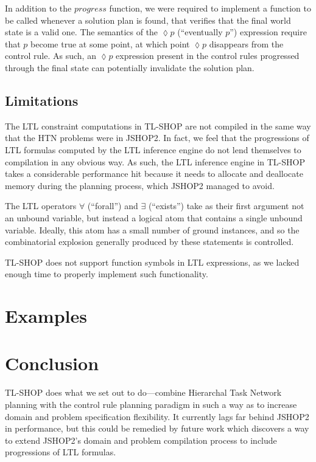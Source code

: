 \documentclass[12pt]{article}
\begin{document}
In addition to the $progress$ function, we were required to implement a 
function to be called whenever a solution plan is found, that verifies that the 
final world state is a valid one. The semantics of the $\lozenge p$ 
(``eventually $p$'') expression require that $p$ become true at some point, at 
which point $\lozenge p$ disappears from the control rule. As such, an 
$\lozenge p$ expression present in the control rules progressed through the 
final state can potentially invalidate the solution plan.

\subsection{Limitations} 
The LTL constraint computations in TL-SHOP are not compiled in the same way 
that the HTN problems were in JSHOP2. In fact, we feel that the progressions of 
LTL formulas computed by the LTL inference engine do not lend themselves to 
compilation in any obvious way. As such, the LTL inference engine in TL-SHOP 
takes a considerable performance hit because it needs to allocate and 
deallocate memory during the planning process, which JSHOP2 managed to avoid.

The LTL operators $\forall$ (``forall'') and $\exists$ (``exists'') take as 
their first argument not an unbound variable, but instead a logical atom that 
contains a single unbound variable. Ideally, this atom has a small number of 
ground instances, and so the combinatorial explosion generally produced by 
these statements is controlled.

TL-SHOP does not support function symbols in LTL expressions, as we lacked 
enough time to properly implement such functionality.

\section{Examples}


\section{Conclusion}
TL-SHOP does what we set out to do---combine Hierarchal Task Network planning 
with the control rule planning paradigm in such a way as to increase domain and 
problem specification flexibility. It currently lags far behind JSHOP2 in 
performance, but this could be remedied by future work which discovers a way to 
extend JSHOP2's domain and problem compilation process to include progressions 
of LTL formulas.



\end{document}
